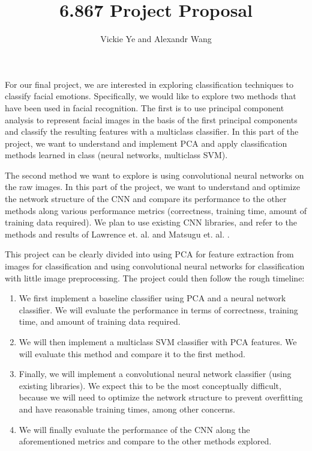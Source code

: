 \documentclass[11pt, twoside]{article}
\title{6.867 Project Proposal}
\date{}
\author {Vickie Ye and Alexandr Wang}
\begin{document}
\maketitle

For our final project, we are interested in exploring classification
techniques to classify facial emotions. Specifically, we would like
to explore two methods that have been used in facial recognition.
The first is to use principal component analysis to represent facial
images in the basis of the first principal components and classify the
resulting features with a multiclass classifier. In this part of the
project, we want to understand and implement PCA and apply
classification methods learned in class (neural networks, multiclass SVM).

The second method we want to explore is using convolutional neural networks
on the raw images. In this part of the project, we want to understand
and optimize the network structure of the CNN and compare its performance
to the other methods along various performance metrics (correctness, training
time, amount of training data required). We plan to use existing CNN libraries,
and refer to the methods and results of Lawrence et. al. \cite{Lawrence} and
Matsugu et. al. \cite{Matsugu}.

This project can be clearly divided into using PCA for feature
extraction from images for classification and using convolutional
neural networks for classification with little image preprocessing.
The project could then follow the rough timeline:
\begin{enumerate}
\item We first implement a baseline classifier using PCA and a neural network
classifier. We will evaluate the performance in terms of correctness, training
time, and amount of training data required.
\item We will then implement a multiclass SVM classifier with PCA features.
We will evaluate this method and compare it to the first method.
\item Finally, we will implement a convolutional neural network classifier
(using existing libraries). We expect this to be the most conceptually
difficult, because we will need to optimize the network structure to
prevent overfitting and have reasonable training times, among other
concerns.
\item We will finally evaluate the performance of the CNN along the
aforementioned metrics and compare to the other methods explored.
\end{enumerate}
\end{document}
